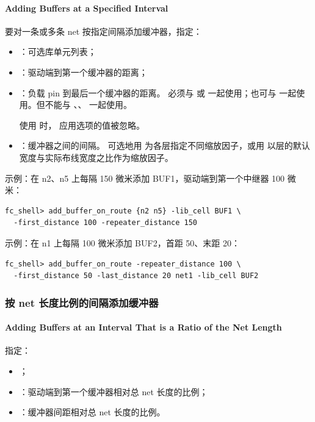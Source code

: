 \paragraph*{Adding Buffers at a Specified Interval}

要对一条或多条 net 按指定间隔添加缓冲器，指定：
\begin{itemize}
  \item {}：可选库单元列表；
  \item {}：驱动端到第一个缓冲器的距离；
  \item {}：负载 pin 到最后一个缓冲器的距离。
  必须与  或  一起使用；也可与  一起使用。但不能与 、、 一起使用。
  \begin{noteBox}
  使用  时， 应用选项的值被忽略。
  \end{noteBox}
  \item {}：缓冲器之间的间隔。
  可选地用  为各层指定不同缩放因子，或用  以层的默认宽度与实际布线宽度之比作为缩放因子。
\end{itemize}

示例：在 n2、n5 上每隔 150 微米添加 BUF1，驱动端到第一个中继器 100 微米：
\begin{lstlisting}
fc_shell> add_buffer_on_route {n2 n5} -lib_cell BUF1 \
  -first_distance 100 -repeater_distance 150
\end{lstlisting}

示例：在 n1 上每隔 100 微米添加 BUF2，首距 50、末距 20：
\begin{lstlisting}
fc_shell> add_buffer_on_route -repeater_distance 100 \
  -first_distance 50 -last_distance 20 net1 -lib_cell BUF2
\end{lstlisting}

\subsubsection{按 net 长度比例的间隔添加缓冲器}
\paragraph*{Adding Buffers at an Interval That is a Ratio of the Net Length}

指定：
\begin{itemize}
  \item {}；
  \item {}：驱动端到第一个缓冲器相对总 net 长度的比例；
  \item {}：缓冲器间距相对总 net 长度的比例。
\end{itemize}


